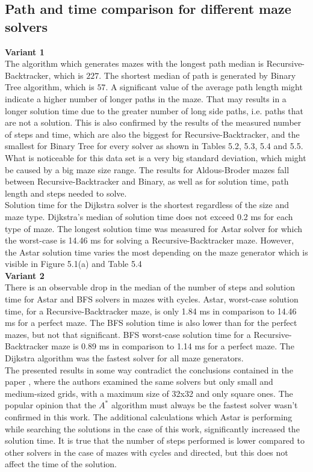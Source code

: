 \subsection{Path and time comparison for different maze solvers}
\textbf{Variant 1}\\
\indent The algorithm which generates mazes with the longest path median is Recursive-Backtracker, which is $227$. The shortest median of path is generated by
Binary Tree algorithm, which is $57$. A significant value of the average path length might indicate a higher number of longer paths in the maze. That 
may results in a longer solution time due to the greater number of long side paths, i.e. paths that are not a solution. This is also confirmed by the results of
the measured number of steps and time, which are also the biggest for Recursive-Backtracker, and the smallest for Binary Tree for every solver as shown in
Tables 5.2, 5.3, 5.4 and 5.5. What is noticeable for this data set is a very big standard deviation, which might be caused by a big maze size range.
The results for Aldous-Broder mazes fall between Recursive-Backtracker and Binary, as well as for solution time, path length and steps needed to solve.\\
\indent Solution time for the Dijkstra solver is the shortest regardless of the size and maze type. Dijkstra's median of solution time does not exceed 0.2 ms for each type of maze.
The longest solution time was measured for Astar solver for which the worst-case is 14.46 ms for solving a Recursive-Backtracker maze.
However, the Astar solution time varies the most depending on the maze generator which is visible in Figure 5.1(a) and Table 5.4\\
\textbf{Variant 2}\\ 
\indent There is an observable drop in the median of the number of steps and solution time for Astar and BFS solvers in mazes with cycles. Astar, worst-case solution time, 
for a Recursive-Backtracker maze, is only 1.84 ms in comparison to 14.46 ms for a perfect maze. The BFS solution time is also lower than for the perfect mazes, but not
that significant. BFS worst-case solution time for a Recursive-Backtracker maze is 0.89 ms in comparison to 1.14 ms for a perfect maze. 
The Dijkstra algorithm was the fastest solver for all maze generators.\\
\indent The presented results in some way contradict the conclusions contained in the paper \cite{31}, where the authors examined the same solvers but 
only small and medium-sized grids, with a maximum size of 32x32 and only square ones. The popular opinion \cite{32} that the $A^*$ algorithm must always be the fastest solver wasn't
confirmed in this work. The additional calculations which Astar is performing while searching the solutions in the case of this work, significantly increased
the solution time. It is true that the number of steps performed is lower compared to other solvers in the case of mazes with cycles and directed,
but this does not affect the time of the solution.\\

